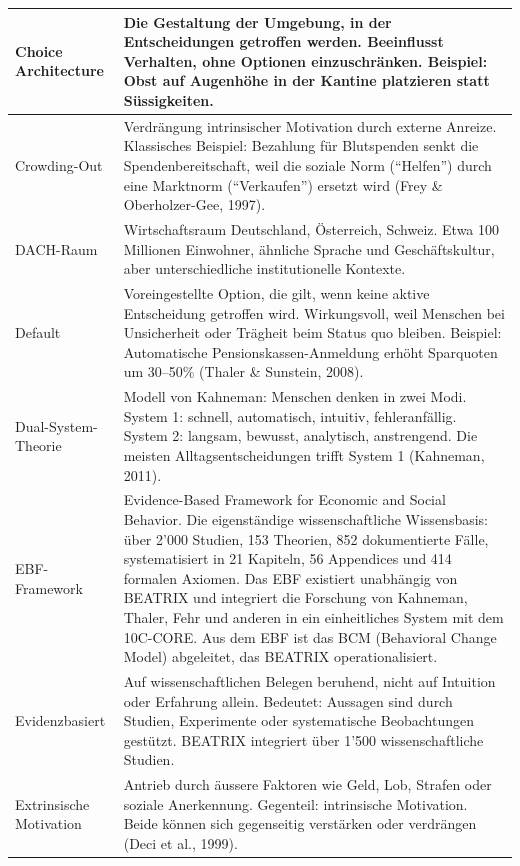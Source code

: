\documentclass[11pt,a4paper]{article}
\begin{document}
\begin{longtable}{@{}L{4cm}L{10cm}@{}}
\midrule
Choice Architecture & Die Gestaltung der Umgebung, in der Entscheidungen getroffen werden. Beeinflusst Verhalten, ohne Optionen einzuschränken. Beispiel: Obst auf Augenhöhe in der Kantine platzieren statt Süssigkeiten. \\
\midrule
Crowding-Out & Verdrängung intrinsischer Motivation durch externe Anreize. Klassisches Beispiel: Bezahlung für Blutspenden senkt die Spendenbereitschaft, weil die soziale Norm (``Helfen'') durch eine Marktnorm (``Verkaufen'') ersetzt wird (Frey \& Oberholzer-Gee, 1997). \\
\midrule
DACH-Raum & Wirtschaftsraum Deutschland, Österreich, Schweiz. Etwa 100 Millionen Einwohner, ähnliche Sprache und Geschäftskultur, aber unterschiedliche institutionelle Kontexte. \\
\midrule
Default & Voreingestellte Option, die gilt, wenn keine aktive Entscheidung getroffen wird. Wirkungsvoll, weil Menschen bei Unsicherheit oder Trägheit beim Status quo bleiben. Beispiel: Automatische Pensionskassen-Anmeldung erhöht Sparquoten um 30--50\% (Thaler \& Sunstein, 2008). \\
\midrule
Dual-System-Theorie & Modell von Kahneman: Menschen denken in zwei Modi. System 1: schnell, automatisch, intuitiv, fehleranfällig. System 2: langsam, bewusst, analytisch, anstrengend. Die meisten Alltagsentscheidungen trifft System 1 (Kahneman, 2011). \\
\midrule
EBF-Framework & Evidence-Based Framework for Economic and Social Behavior. Die eigenständige wissenschaftliche Wissensbasis: über 2'000 Studien, 153 Theorien, 852 dokumentierte Fälle, systematisiert in 21 Kapiteln, 56 Appendices und 414 formalen Axiomen. Das EBF existiert unabhängig von BEATRIX und integriert die Forschung von Kahneman, Thaler, Fehr und anderen in ein einheitliches System mit dem 10C-CORE. Aus dem EBF ist das BCM (Behavioral Change Model) abgeleitet, das BEATRIX operationalisiert. \\
\midrule
Evidenzbasiert & Auf wissenschaftlichen Belegen beruhend, nicht auf Intuition oder Erfahrung allein. Bedeutet: Aussagen sind durch Studien, Experimente oder systematische Beobachtungen gestützt. BEATRIX integriert über 1'500 wissenschaftliche Studien. \\
\midrule
Extrinsische Motivation & Antrieb durch äussere Faktoren wie Geld, Lob, Strafen oder soziale Anerkennung. Gegenteil: intrinsische Motivation. Beide können sich gegenseitig verstärken oder verdrängen (Deci et al., 1999). \\
\midrule

\end{longtable}
\end{document}
